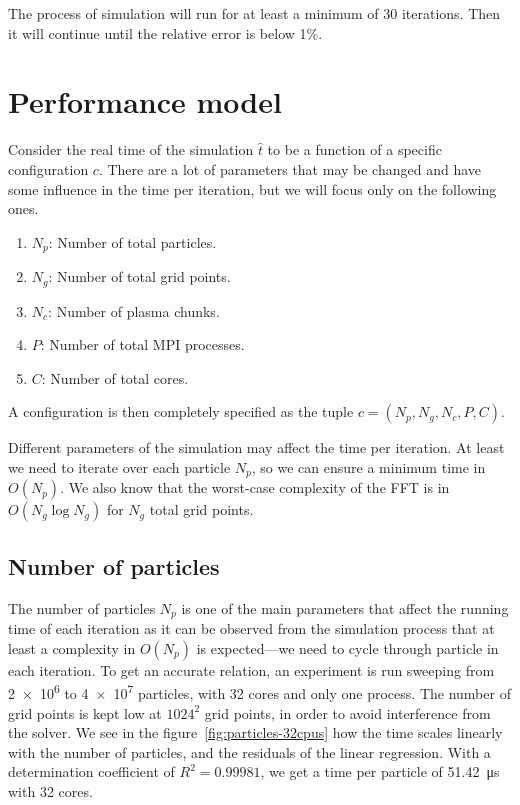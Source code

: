 The process of simulation will run for at least a minimum of 30 iterations. Then 
it will continue until the relative error is below 1\%.

\section{Performance model}

Consider the real time of the simulation $\hat t$ to be a function of a specific 
configuration $c$. There are a lot of parameters that may be changed and have 
some influence in the time per iteration, but we will focus only on the 
following ones.
%
\begin{enumerate}
\item $N_p$: Number of total particles.
\item $N_g$: Number of total grid points.
\item $N_c$: Number of plasma chunks.
\item $P$: Number of total MPI processes.
\item $C$: Number of total cores.
\end{enumerate}
%
A configuration is then completely specified as the tuple $c = (N_p, N_g, N_c, 
P, C)$.

Different parameters of the simulation may affect the time per iteration. At 
least we need to iterate over each particle $N_p$, so  we can ensure a minimum 
time in $O(N_p)$. We also know that the worst-case complexity of the FFT is in 
$O(N_g \log N_g)$ for $N_g$ total grid points.

\subsection{Number of particles}

The number of particles $N_p$ is one of the main parameters that affect the
running time of each iteration as it can be observed from the simulation process 
that at least a complexity in $O(N_p)$ is expected---we need to cycle through 
particle in each iteration. To get an accurate relation, an experiment is run 
sweeping from \num{2e6} to \num{4e7} particles, with 32 cores and only one 
process. The number of grid points is kept low at $1024^2$ grid points, in order 
to avoid interference from the solver. We see in the 
figure~\ref{fig:particles-32cpus} how the time scales linearly with the number 
of particles, and the residuals of the linear regression. With a determination 
coefficient of $R^2 = 0.99981$, we get a time per particle of 
\SI{51.42}{\micro\second} with 32 cores.


